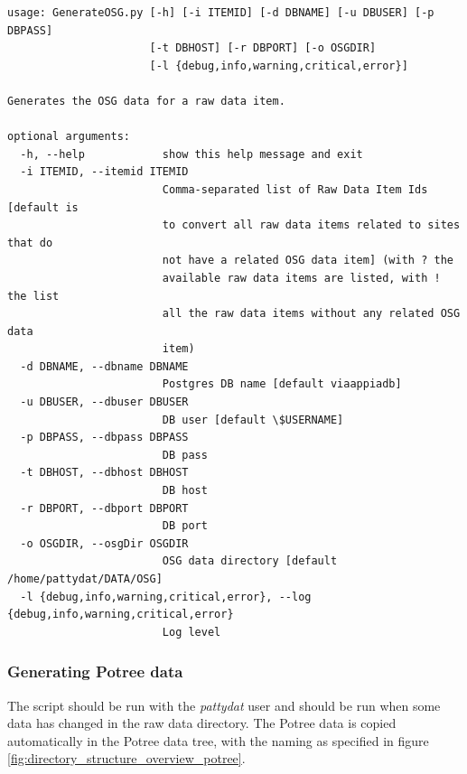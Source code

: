 \begin{Verbatim}[fontfamily=courier,commandchars=\\\{\},fontsize=\footnotesize]
usage: GenerateOSG.py [-h] [-i ITEMID] [-d DBNAME] [-u DBUSER] [-p DBPASS]
                      [-t DBHOST] [-r DBPORT] [-o OSGDIR]
                      [-l {debug,info,warning,critical,error}]

Generates the OSG data for a raw data item.

optional arguments:
  -h, --help            show this help message and exit
  -i ITEMID, --itemid ITEMID
                        Comma-separated list of Raw Data Item Ids [default is
                        to convert all raw data items related to sites that do
                        not have a related OSG data item] (with ? the
                        available raw data items are listed, with ! the list
                        all the raw data items without any related OSG data
                        item)
  -d DBNAME, --dbname DBNAME
                        Postgres DB name [default viaappiadb]
  -u DBUSER, --dbuser DBUSER
                        DB user [default \$USERNAME]
  -p DBPASS, --dbpass DBPASS
                        DB pass
  -t DBHOST, --dbhost DBHOST
                        DB host
  -r DBPORT, --dbport DBPORT
                        DB port
  -o OSGDIR, --osgDir OSGDIR
                        OSG data directory [default /home/pattydat/DATA/OSG]
  -l {debug,info,warning,critical,error}, --log {debug,info,warning,critical,error}
                        Log level
\end{Verbatim}

\subsubsection{Generating Potree data}
\label{sec:generatePotree} 
The script should be run with the \textit{pattydat} user and should be run when some data
has changed in the raw data directory. The Potree data is copied automatically
in the Potree data tree, with the naming as specified in figure
\ref{fig:directory_structure_overview_potree}.

